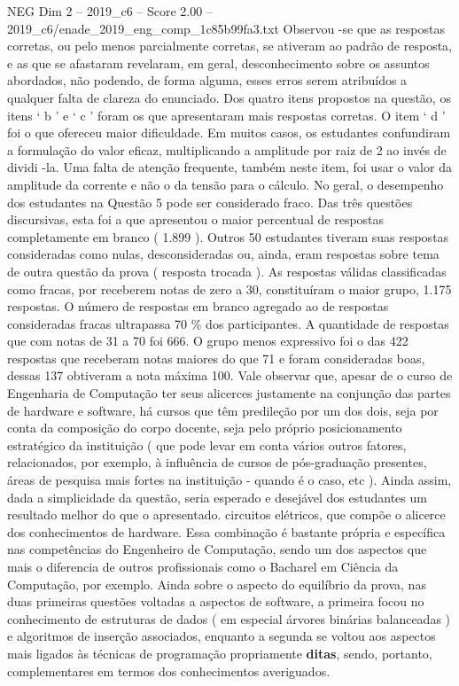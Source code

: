 \begin{textsample}{NEG Dim 2 – 2019\_c6 – Score 2.00 – 2019\_c6/enade\_2019\_eng\_comp\_1c85b99fa3.txt}
Observou -se que as respostas corretas, ou pelo menos parcialmente corretas, se ativeram ao padrão de resposta, e as que se afastaram revelaram, em geral, desconhecimento sobre os assuntos abordados, não podendo, de forma alguma, esses erros serem atribuídos a qualquer falta de clareza do enunciado.
Dos quatro itens propostos na questão, os itens ‘ b ’ e ‘ c ’ foram os que apresentaram mais respostas corretas.
O item ‘ d ’ foi o que ofereceu maior dificuldade.
Em muitos casos, os estudantes confundiram a formulação do valor eficaz, multiplicando a amplitude por raiz de 2 ao invés de dividi -la.
Uma falta de atenção frequente, também neste item, foi usar o valor da amplitude da corrente e não o da tensão para o cálculo.
No geral, o desempenho dos estudantes na Questão 5 pode ser considerado fraco.
Das três questões discursivas, esta foi a que apresentou o maior percentual de respostas completamente em branco ( 1.899 ).
Outros 50 estudantes tiveram suas respostas consideradas como nulas, desconsideradas ou, ainda, eram respostas sobre tema de outra questão da prova ( resposta trocada ).
As respostas válidas classificadas como fracas, por receberem notas de zero a 30, constituíram o maior grupo, 1.175 respostas.
O número de respostas em branco agregado ao de respostas consideradas fracas ultrapassa 70 \% dos participantes.
A quantidade de respostas que com notas de 31 a 70 foi 666.
O grupo menos expressivo foi o das 422 respostas que receberam notas maiores do que 71 e foram consideradas boas, dessas 137 obtiveram a nota máxima 100.
Vale observar que, apesar de o curso de Engenharia de Computação ter seus alicerces justamente na conjunção das partes de hardware e software, há cursos que têm predileção por um dos dois, seja por conta da composição do corpo docente, seja pelo próprio posicionamento estratégico da instituição ( que pode levar em conta vários outros fatores, relacionados, por exemplo, à influência de cursos de pós-graduação presentes, áreas de pesquisa mais fortes na instituição - quando é o caso, etc ).
Ainda assim, dada a simplicidade da questão, seria esperado e desejável dos estudantes um resultado melhor do que o apresentado. circuitos elétricos, que compõe o alicerce dos conhecimentos de hardware.
Essa combinação é bastante própria e específica nas competências do Engenheiro de Computação, sendo um dos aspectos que mais o diferencia de outros profissionais como o Bacharel em Ciência da Computação, por exemplo.
Ainda sobre o aspecto do equilíbrio da prova, nas duas primeiras questões voltadas a aspectos de software, a primeira focou no conhecimento de estruturas de dados ( em especial árvores binárias balanceadas ) e algoritmos de inserção associados, enquanto a segunda se voltou aos aspectos mais ligados às técnicas de programação propriamente \textbf{ditas}, sendo, portanto, complementares em termos dos conhecimentos averiguados.

\end{textsample}
